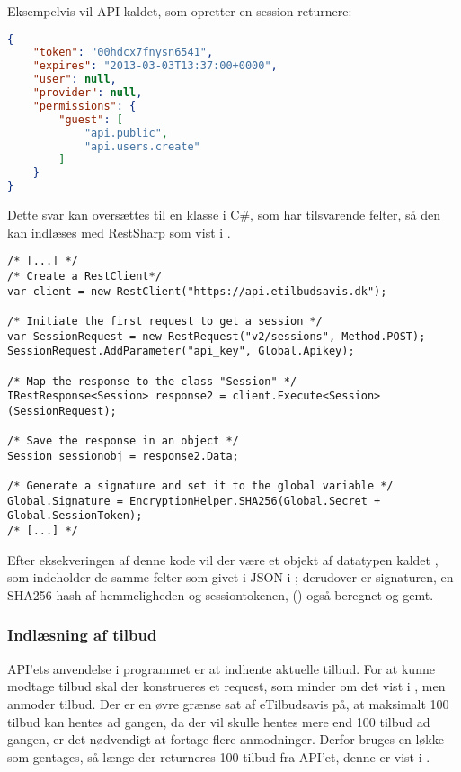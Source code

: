 Eksempelvis vil API-kaldet, som opretter en session returnere:
\begin{lstlisting}[language=json,firstnumber=1,caption={POST til sessions API'et med APIKEY'en},label=apilst1]
{
    "token": "00hdcx7fnysn6541",
    "expires": "2013-03-03T13:37:00+0000",
    "user": null,
    "provider": null,
    "permissions": {
        "guest": [
            "api.public",
            "api.users.create"
        ]
    }
}
\end{lstlisting}

Dette svar kan oversættes til en klasse i C\#, som har tilsvarende felter, så den kan indlæses med RestSharp som vist i .

\begin{lstlisting}[caption=C\#-kode som opretter en RestClient og anvender den til at oprette et objekt med felter som svarer til JSON dataet givet fra API'en, label=lst:session]
/* [...] */
/* Create a RestClient*/
var client = new RestClient("https://api.etilbudsavis.dk");

/* Initiate the first request to get a session */
var SessionRequest = new RestRequest("v2/sessions", Method.POST);
SessionRequest.AddParameter("api_key", Global.Apikey);

/* Map the response to the class "Session" */
IRestResponse<Session> response2 = client.Execute<Session>(SessionRequest);

/* Save the response in an object */
Session sessionobj = response2.Data;

/* Generate a signature and set it to the global variable */
Global.Signature = EncryptionHelper.SHA256(Global.Secret + Global.SessionToken);
/* [...] */
\end{lstlisting}
Efter eksekveringen af denne kode vil der være et objekt af datatypen  kaldet , som indeholder de samme felter som givet i JSON i ; derudover er signaturen, en SHA256 hash af hemmeligheden og sessiontokenen, () også beregnet og gemt.

\subsubsection{Indlæsning af tilbud}
API'ets anvendelse i programmet er at indhente aktuelle tilbud.
For at kunne modtage tilbud skal der konstrueres et request, som minder om det vist i , men anmoder tilbud.
Der er en øvre grænse sat af eTilbudsavis på, at maksimalt 100 tilbud kan hentes ad gangen, da der vil skulle hentes mere end 100 tilbud ad gangen, er det nødvendigt at fortage flere anmodninger.
Derfor bruges en  løkke som gentages, så længe der returneres 100 tilbud fra API'et, denne er vist i .

